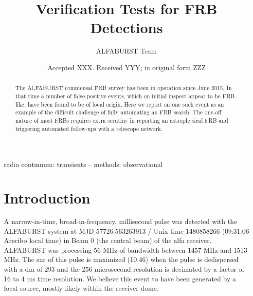 \documentclass[a4paper,fleqn,usenatbib]{mnras}
\title[Verification Tests for FRB Detections]{Verification Tests for FRB
Detections}
\author[ALFABURST Team]{
ALFABURST Team
}
\date{Accepted XXX. Received YYY; in original form ZZZ}
\begin{document}
\label{firstpage}
\pagerange{\pageref{firstpage}--\pageref{lastpage}}
\maketitle

\begin{abstract}
The ALFABURST commensal FRB survey has been in operation since June 2015. In
that time a number of false-positive events, which on initial inspect appear to
be FRB-like, have been found to be of local origin. Here we report on one such event
as an example of the difficult challenge of fully automating an FRB search. The
one-off nature of most FRBs requires extra scrutiny in reporting an
astrophysical FRB and triggering automated follow-ups with a telescope network.
\end{abstract}

\begin{keywords}
radio continuum: transients -- methods: observational
\end{keywords}



\section{Introduction}

A narrow-in-time, broad-in-frequency, millisecond pulse was detected with the
ALFABURST \citep{2017ApJS..228...21C} system at MJD 57726.563263913 / Unix time
1480858266 (09:31:06 Arecibo local time) in Beam 0 (the central beam) of the
\gls{alfa} receiver. ALFABURST was processing 56 MHz of bandwidth between 1457
MHz and 1513 MHz. The \gls{snr} of this pulse is maximized (10.46) when the
pulse is dedispersed with a \gls{dm} of 293 and the 256 microsecond resolution
is decimated by a factor of 16 to 4 ms time resolution. We believe this event to
have been generated by a local source, mostly likely within the receiver dome.
\end{document}
